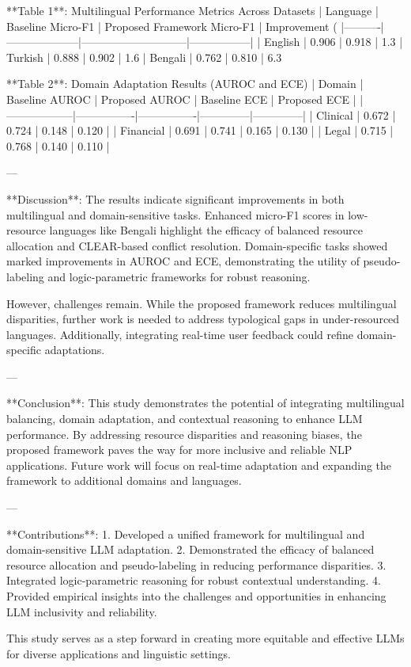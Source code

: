 **Table 1**: Multilingual Performance Metrics Across Datasets  
| Language | Baseline Micro-F1 | Proposed Framework Micro-F1 | Improvement (%
|----------|--------------------|-----------------------------|-----------------|  
| English  | 0.906             | 0.918                       | 1.3%
| Turkish  | 0.888             | 0.902                       | 1.6%
| Bengali  | 0.762             | 0.810                       | 6.3%

**Table 2**: Domain Adaptation Results (AUROC and ECE)  
| Domain          | Baseline AUROC | Proposed AUROC | Baseline ECE | Proposed ECE |  
|------------------|----------------|----------------|--------------|--------------|  
| Clinical         | 0.672          | 0.724          | 0.148        | 0.120        |  
| Financial        | 0.691          | 0.741          | 0.165        | 0.130        |  
| Legal            | 0.715          | 0.768          | 0.140        | 0.110        |  

---

**Discussion**:  
The results indicate significant improvements in both multilingual and domain-sensitive tasks. Enhanced micro-F1 scores in low-resource languages like Bengali highlight the efficacy of balanced resource allocation and CLEAR-based conflict resolution. Domain-specific tasks showed marked improvements in AUROC and ECE, demonstrating the utility of pseudo-labeling and logic-parametric frameworks for robust reasoning.

However, challenges remain. While the proposed framework reduces multilingual disparities, further work is needed to address typological gaps in under-resourced languages. Additionally, integrating real-time user feedback could refine domain-specific adaptations.

---

**Conclusion**:  
This study demonstrates the potential of integrating multilingual balancing, domain adaptation, and contextual reasoning to enhance LLM performance. By addressing resource disparities and reasoning biases, the proposed framework paves the way for more inclusive and reliable NLP applications. Future work will focus on real-time adaptation and expanding the framework to additional domains and languages.

---

**Contributions**:  
1. Developed a unified framework for multilingual and domain-sensitive LLM adaptation.  
2. Demonstrated the efficacy of balanced resource allocation and pseudo-labeling in reducing performance disparities.  
3. Integrated logic-parametric reasoning for robust contextual understanding.  
4. Provided empirical insights into the challenges and opportunities in enhancing LLM inclusivity and reliability.  

This study serves as a step forward in creating more equitable and effective LLMs for diverse applications and linguistic settings.